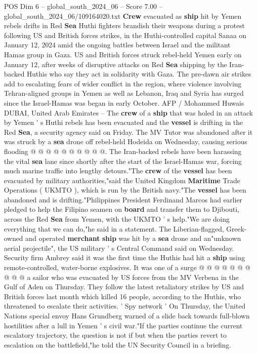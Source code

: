 \begin{textsample}{POS Dim 6 – global\_south\_2024\_06 – Score 7.00 – global\_south\_2024\_06/109164020.txt}  \label{ex:f6_pos_155}
\textbf{Crew} evacuated as \textbf{ship} hit by Yemen rebels drifts in Red \textbf{Sea} Huthi fighters brandish their weapons during a protest following US and British forces strikes, in the Huthi-controlled capital Sanaa on January 12, 2024 amid the ongoing battles between Israel and the militant Hamas group in Gaza.
US and British forces struck rebel-held Yemen early on January 12, after weeks of disruptive attacks on Red \textbf{Sea} shipping by the Iran-backed Huthis who say they act in solidarity with Gaza.
The pre-dawn air strikes add to escalating fears of wider conflict in the region, where violence involving Tehran-aligned groups in Yemen as well as Lebanon, Iraq and Syria has surged since the Israel-Hamas was began in early October.
AFP / Mohammed Huwais DUBAI, United Arab Emirates -- The \textbf{crew} of a \textbf{ship} that was holed in an attack by Yemen ' s Huthi rebels has been evacuated and the \textbf{vessel} is drifting in the Red \textbf{Sea}, a security agency said on Friday.
The MV Tutor was abandoned after it was struck by a \textbf{sea} drone off rebel-held Hodeida on Wednesday, causing serious flooding @ @ @ @ @ @ @ @ @ @.
The Iran-backed rebels have been harassing the vital \textbf{sea} lane since shortly after the start of the Israel-Hamas war, forcing much marine traffic into lengthy detours."The \textbf{crew} of the \textbf{vessel} has been evacuated by military authorities,"said the United Kingdom \textbf{Maritime} Trade Operations ( UKMTO ), which is run by the British navy."The \textbf{vessel} has been abandoned and is drifting."Philippines President Ferdinand Marcos had earlier pledged to help the Filipino seamen on \textbf{board} and transfer them to Djibouti, across the Red \textbf{Sea} from Yemen, with the UKMTO ' s help."We are doing everything that we can do,"he said in a statement.
The Liberian-flagged, Greek-owned and operated \textbf{merchant} \textbf{ship} was hit by a \textbf{sea} drone and an"unknown aerial projectile", the US military ' s Central Command said on Wednesday.
Security firm Ambrey said it was the first time the Huthis had hit a \textbf{ship} using remote-controlled, water-borne explosives.
It was one of a surge @ @ @ @ @ @ @ @ @ @ a sailor who was evacuated by US forces from the MV Verbena in the Gulf of Aden on Thursday.
They follow the latest retaliatory strikes by US and British forces last month which killed 16 people, according to the Huthis, who threatened to escalate their activities. ' Spy network ' On Thursday, the United Nations special envoy Hans Grundberg warned of a slide back towards full-blown hostilities after a lull in Yemen ' s civil war."If the parties continue the current escalatory trajectory, the question is not if but when the parties revert to escalation on the battlefield,"he told the UN Security Council in a briefing.

\end{textsample}
